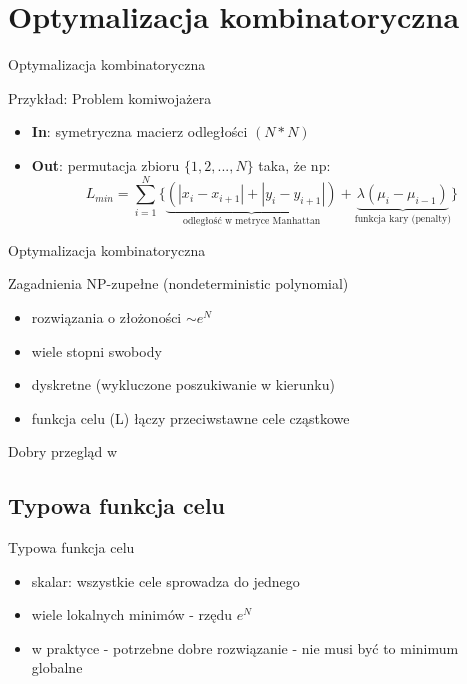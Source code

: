 \section{Optymalizacja kombinatoryczna}

	\begin{frame}{Optymalizacja kombinatoryczna }
		\begin{exampleblock}{Przykład: Problem komiwojażera}
			\begin{itemize}
				\item \textbf{In}: symetryczna macierz odległości $(N*N)$

				\item \textbf{Out}: permutacja zbioru $\{1,2,...,N\}$ taka, że np:
					$$
						L_{min} = \sum_{i=1}^N \{ \underbrace{(|x_i - x_{i+1}| + |y_i - y_{i+1}|)}_\text{odległość w metryce Manhattan} + \underbrace{\lambda(\mu_i - \mu_{i-1})}_\text{funkcja kary (penalty)}\}
					$$
			\end{itemize}
		\end{exampleblock}

	\end{frame}

	\begin{frame}{Optymalizacja kombinatoryczna}
		\begin{exampleblock}{Zagadnienia NP-zupełne (nondeterministic polynomial)}
			\begin{itemize}
				\item rozwiązania o złożoności $\sim e^N$
				\item wiele stopni swobody
				\item dyskretne (wykluczone poszukiwanie w kierunku)
				\item funkcja celu (L) łączy przeciwstawne cele cząstkowe
			\end{itemize}
		\end{exampleblock}
		Dobry przegląd w \cite{garey}
	\end{frame}

\subsection{Typowa funkcja celu}
	\begin{frame}{Typowa funkcja celu}
		\begin{itemize}
			\item skalar: wszystkie cele sprowadza do jednego
			\item wiele lokalnych minimów - rzędu $e^N$
			\item w praktyce - potrzebne dobre rozwiązanie - nie musi być to minimum globalne
		\end{itemize}

	\end{frame}

